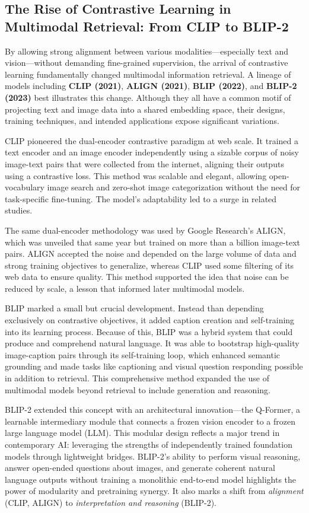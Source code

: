 \documentclass[conference]{IEEEtran}
\begin{document}
\subsection{The Rise of Contrastive Learning in Multimodal Retrieval: From CLIP to BLIP-2}

By allowing strong alignment between various modalities—especially text and vision—without demanding fine-grained supervision, the arrival of contrastive learning fundamentally changed multimodal information retrieval. A lineage of models including \textbf{CLIP (2021)}, \textbf{ALIGN (2021)}, \textbf{BLIP (2022)}, and \textbf{BLIP-2 (2023)} best illustrates this change. Although they all have a common motif of projecting text and image data into a shared embedding space, their designs, training techniques, and intended applications expose significant variations.

CLIP pioneered the dual-encoder contrastive paradigm at web scale. It trained a text encoder and an image encoder independently using a sizable corpus of noisy image-text pairs that were collected from the internet, aligning their outputs using a contrastive loss. This method was scalable and elegant, allowing open-vocabulary image search and zero-shot image categorization without the need for task-specific fine-tuning. The model's adaptability led to a surge in related studies.

The same dual-encoder methodology was used by Google Research's ALIGN, which was unveiled that same year but trained on more than a billion image-text pairs. ALIGN accepted the noise and depended on the large volume of data and strong training objectives to generalize, whereas CLIP used some filtering of its web data to ensure quality. This method supported the idea that noise can be reduced by scale, a lesson that informed later multimodal models.

BLIP marked a small but crucial development. Instead than depending exclusively on contrastive objectives, it added caption creation and self-training into its learning process. Because of this, BLIP was a hybrid system that could produce and comprehend natural language. It was able to bootstrap high-quality image-caption pairs through its self-training loop, which enhanced semantic grounding and made tasks like captioning and visual question responding possible in addition to retrieval. This comprehensive method expanded the use of multimodal models beyond retrieval to include generation and reasoning.

BLIP-2 extended this concept with an architectural innovation—the Q-Former, a learnable intermediary module that connects a frozen vision encoder to a frozen large language model (LLM). This modular design reflects a major trend in contemporary AI: leveraging the strengths of independently trained foundation models through lightweight bridges. BLIP-2’s ability to perform visual reasoning, answer open-ended questions about images, and generate coherent natural language outputs without training a monolithic end-to-end model highlights the power of modularity and pretraining synergy. It also marks a shift from \textit{alignment} (CLIP, ALIGN) to \textit{interpretation and reasoning} (BLIP-2).
\end{document}
